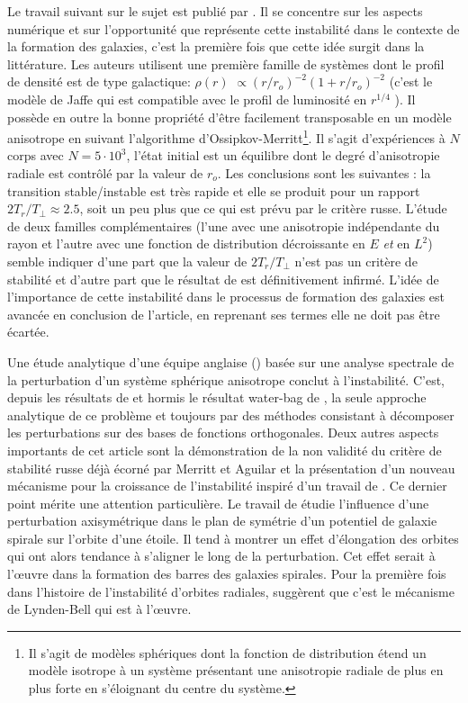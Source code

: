 Le travail suivant sur le sujet est publié par \cite{merritt_aguilar}.
Il se concentre sur les aspects numérique et
sur l'opportunité que représente cette instabilité dans le contexte de la formation des galaxies, c'est la première fois que cette idée surgit dans la
littérature. Les auteurs utilisent une première famille de systèmes dont le profil de densité est \og de type galactique\fg: $\rho\left(  r\right)
$ $\propto (r/r_{o})^{-2}(1+r/r_{o})^{-2}$ (c'est le modèle de Jaffe qui est compatible avec le profil de luminosité en $r^{1/4}$ ). Il possède
en outre la bonne propriété d'être facilement transposable en un modèle anisotrope en suivant l'algorithme d'Ossipkov-Merritt\footnote{Il s'agit de
modèles sphériques dont la fonction de distribution étend un modèle isotrope à un système présentant une anisotropie radiale de plus en plus forte en
s'éloignant du centre du système.}. Il s'agit d'expériences à $N$ corps avec $N=5\cdot10^{3}$, l'état initial est un équilibre dont le degré
d'anisotropie radiale est contrôlé par la valeur de $r_{o}$. Les conclusions sont les suivantes : la transition stable/instable est très rapide et
elle se produit pour un rapport $2T_{r}/T_{\perp}\approx2.5$, soit un peu plus que ce qui est prévu par le critère russe. L'étude de deux familles
complémentaires (l'une avec une anisotropie indépendante du rayon et l'autre avec une fonction de distribution décroissante en $E$ \emph{et} en
$L^{2}$) semble indiquer d'une part que la valeur de $2T_{r}/T_{\perp}$ n'est pas un critère de stabilité et d'autre part que le résultat
de \cite{waterbag} est définitivement infirmé. L'idée de l'importance de cette instabilité dans le processus de formation des galaxies
est avancée en conclusion de l'article, en reprenant ses termes \og elle ne doit pas être écartée\fg.

Une étude analytique d'une équipe anglaise (\cite{palmerpapa}) basée sur une analyse spectrale de la perturbation d'un système sphérique anisotrope
conclut à l'instabilité. C'est, depuis les résultats de \cite{polyach} et hormis le résultat water-bag de \cite{waterbag}, la seule approche
analytique de ce problème et toujours par des méthodes consistant à décomposer les perturbations sur des bases de fonctions orthogonales.
Deux autres aspects importants de cet article sont la démonstration de la non validité du critère de stabilité russe déjà écorné par Merritt
et Aguilar et la présentation d'un nouveau mécanisme pour la croissance de l'instabilité inspiré d'un travail de \cite{lyndenbell}. Ce dernier point
mérite une attention particulière. Le travail de \cite{lyndenbell} étudie l'influence d'une perturbation axisymétrique dans le plan de symétrie d'un
potentiel de galaxie spirale sur l'orbite d'une étoile. Il tend à montrer un effet d'élongation des orbites qui ont alors tendance à s'aligner le long
de la perturbation. Cet effet serait à l'œuvre dans la formation des barres des galaxies spirales. Pour la première fois dans l'histoire de
l'instabilité d'orbites radiales, \cite{palmerpapa} suggèrent que c'est le mécanisme de Lynden-Bell qui est à l'œuvre.

